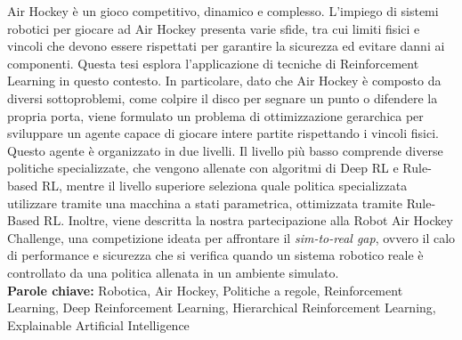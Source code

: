 Air Hockey è un gioco competitivo, dinamico e complesso. L'impiego di sistemi robotici per giocare ad Air Hockey presenta varie sfide, 
tra cui limiti fisici e vincoli che devono essere rispettati per garantire la sicurezza ed evitare danni ai componenti. 
Questa tesi esplora l'applicazione di tecniche di Reinforcement Learning in questo contesto. 
In particolare, dato che Air Hockey è composto da diversi sottoproblemi, come colpire il disco per segnare un punto o difendere la propria porta, 
viene formulato un problema di ottimizzazione gerarchica per sviluppare un agente capace di giocare intere partite rispettando i vincoli fisici.
Questo agente è organizzato in due livelli. Il livello più basso comprende diverse politiche specializzate, che vengono allenate con algoritmi di Deep RL
e Rule-based RL, mentre il livello superiore seleziona quale politica specializzata utilizzare tramite una macchina a stati parametrica, ottimizzata tramite Rule-Based RL.
Inoltre, viene descritta la nostra partecipazione alla Robot Air Hockey Challenge, una competizione ideata per affrontare il \textit{sim-to-real gap}, 
ovvero il calo di performance e sicurezza che si verifica quando un sistema robotico reale è controllato da una politica allenata in un ambiente simulato.\\

\textbf{Parole chiave:} Robotica, Air Hockey, Politiche a regole, Reinforcement Learning, Deep Reinforcement Learning, Hierarchical Reinforcement Learning, Explainable Artificial Intelligence %